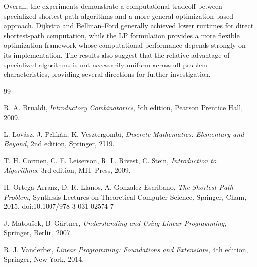 \documentclass[12pt]{report}
\begin{document}
Overall, the experiments demonstrate a computational tradeoff between specialized shortest-path algorithms and a more general optimization-based approach. Dijkstra and Bellman--Ford generally achieved lower runtimes for direct shortest-path computation, while the LP formulation provides a more flexible optimization framework whose computational performance depends strongly on its implementation. The results also suggest that the relative advantage of specialized algorithms is not necessarily uniform across all problem characteristics, providing several directions for further investigation.


\begin{thebibliography}{99}

R. A. Brualdi,
\textit{Introductory Combinatorics},
5th edition,
Pearson Prentice Hall, 2009.

L. Lov\'asz, J. Pelik\'an, K. Vesztergombi,
\textit{Discrete Mathematics: Elementary and Beyond},
2nd edition,
Springer, 2019.

T. H. Cormen, C. E. Leiserson, R. L. Rivest, C. Stein,
\textit{Introduction to Algorithms},
3rd edition,
MIT Press, 2009.

H. Ortega-Arranz, D. R. Llanos, A. Gonzalez-Escribano,
\textit{The Shortest-Path Problem},
Synthesis Lectures on Theoretical Computer Science,
Springer, Cham, 2015.
doi:10.1007/978-3-031-02574-7

J. Matou\v{s}ek, B. G\"artner,
\textit{Understanding and Using Linear Programming},
Springer, Berlin, 2007.

R. J. Vanderbei,
\textit{Linear Programming: Foundations and Extensions},
4th edition,
Springer, New York, 2014.

\end{thebibliography}
\end{document}
